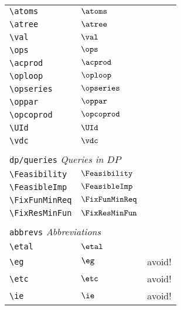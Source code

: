 \begin{longtable}{lll}
 {\color[rgb]{0.5,0.5,0.5}\texttt{\textbackslash atoms}} & $\atoms$ & \\ 
 {\color[rgb]{0.5,0.5,0.5}\texttt{\textbackslash atree}} & $\atree$ & \\ 
 {\color[rgb]{0.5,0.5,0.5}\texttt{\textbackslash val}} & $\val$ & \\ 
 {\color[rgb]{0.5,0.5,0.5}\texttt{\textbackslash ops}} & $\ops$ & \\ 
 {\color[rgb]{0.5,0.5,0.5}\texttt{\textbackslash acprod}} & $\acprod$ & \\ 
 {\color[rgb]{0.5,0.5,0.5}\texttt{\textbackslash oploop}} & $\oploop$ & \\ 
 {\color[rgb]{0.5,0.5,0.5}\texttt{\textbackslash opseries}} & $\opseries$ & \\ 
 {\color[rgb]{0.5,0.5,0.5}\texttt{\textbackslash oppar}} & $\oppar$ & \\ 
 {\color[rgb]{0.5,0.5,0.5}\texttt{\textbackslash opcoprod}} & $\opcoprod$ & \\ 
 {\color[rgb]{0.5,0.5,0.5}\texttt{\textbackslash UId}} & $\UId$ & \\ 
 {\color[rgb]{0.5,0.5,0.5}\texttt{\textbackslash vdc}} & $\vdc$ & \\ 
  &  & \\ 
 \multicolumn{3}{l}{{\color[rgb]{0.5,0.5,0.5}\texttt{dp/queries}} \emph{Queries in $DP$}}\\ 
 \hline
{\color[rgb]{0.5,0.5,0.5}\texttt{\textbackslash Feasibility}} & $\Feasibility$ & \\ 
 {\color[rgb]{0.5,0.5,0.5}\texttt{\textbackslash FeasibleImp}} & $\FeasibleImp$ & \\ 
 {\color[rgb]{0.5,0.5,0.5}\texttt{\textbackslash FixFunMinReq}} & $\FixFunMinReq$ & \\ 
 {\color[rgb]{0.5,0.5,0.5}\texttt{\textbackslash FixResMinFun}} & $\FixResMinFun$ & \\ 
  &  & \\ 
 \multicolumn{3}{l}{{\color[rgb]{0.5,0.5,0.5}\texttt{abbrevs}} \emph{Abbreviations}}\\ 
 \hline
\hline
{\color[rgb]{0.5,0.5,0.5}\texttt{\textbackslash etal}} & $\etal$ & \\ 
 {\color[rgb]{0.5,0.5,0.5}\texttt{\textbackslash eg}} & $\eg$ &  avoid!\\ 
 {\color[rgb]{0.5,0.5,0.5}\texttt{\textbackslash etc}} & $\etc$ &  avoid!\\ 
 {\color[rgb]{0.5,0.5,0.5}\texttt{\textbackslash ie}} & $\ie$ &  avoid!\\ 

\end{longtable}
